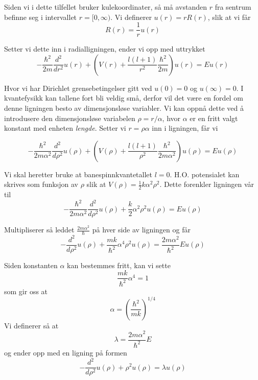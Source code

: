\documentclass{article}
\begin{document}
Siden vi i dette tilfellet bruker kulekoordinater, så må avstanden $r$ fra sentrum befinne seg i intervallet $r = [0, \infty)$. Vi definerer $u(r) = rR(r)$, slik at vi får 
\begin{equation}
R(r) = \frac{1}{r}u(r)
\end{equation}

Setter vi dette inn i radialligningen, ender vi opp med uttrykket 
\begin{equation}
  -\frac{\hbar^2}{2 m} \frac{d^2}{dr^2} u(r) 
       + \left ( V(r) + \frac{l (l + 1)}{r^2}\frac{\hbar^2}{2 m}
                                    \right ) u(r)  = E u(r)
\end{equation}

Hvor vi har Dirichlet grensebetingelser gitt ved $u(0) = 0$ og $u(\infty) = 0$. I kvantefysikk kan tallene fort bli veldig små, derfor vil det være en fordel om denne ligningen besto av dimensjonsløse variabler. Vi kan oppnå dette ved å introdusere den dimensjonsløse variabelen $\rho = r/\alpha$, hvor $\alpha$ er en fritt valgt konstant med enheten \textit{lengde}. Setter vi $r = \rho \alpha$ inn i ligningen, får vi

\begin{equation}
  -\frac{\hbar^2}{2 m \alpha^2} \frac{d^2}{d\rho^2} u(\rho) 
       + \left ( V(\rho) + \frac{l (l + 1)}{\rho^2}
         \frac{\hbar^2}{2 m\alpha^2} \right ) u(\rho)  = E u(\rho)
\end{equation} 

Vi skal heretter bruke at banespinnkvantetallet $l = 0$. H.O. potensialet kan skrives som funksjon av $\rho$ slik at $V(\rho) = \frac{1}{2}k\alpha^2\rho^2$. Dette forenkler ligningen vår til
\begin{equation}
  -\frac{\hbar^2}{2 m \alpha^2} \frac{d^2}{d\rho^2} u(\rho) 
       + \frac{k}{2} \alpha^2\rho^2u(\rho)  = E u(\rho)
\end{equation}

Multipliserer så leddet $\frac{2m\alpha^2}{\hbar}$ på hver side av ligningen og får
\begin{equation}
  -\frac{d^2}{d\rho^2} u(\rho) 
       + \frac{mk}{\hbar^2} \alpha^4\rho^2u(\rho)  = \frac{2m\alpha^2}{\hbar^2}E u(\rho)
\end{equation}

Siden konstanten $\alpha$ kan bestemmes fritt, kan vi sette 
\[\frac{mk}{\hbar^2}\alpha^4 = 1 \]
som gir oss at
\[\alpha = \left(\frac{\hbar^2}{mk} \right)^{1/4} \]
Vi definerer så at
\[\lambda = \frac{2m\alpha^2}{\hbar^2}E \]
og ender opp med en ligning på formen
\begin{equation}
  -\frac{d^2}{d\rho^2} u(\rho) + \rho^2u(\rho)  = \lambda u(\rho)
\end{equation}
\end{document}
